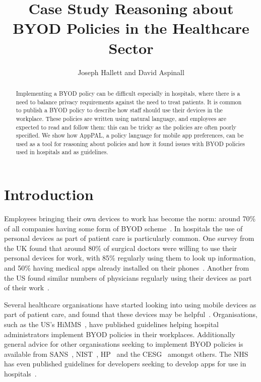 \documentclass[a4paper]{article}
\title{Case Study Reasoning about BYOD Policies in the Healthcare Sector}
\author{Joseph Hallett and David Aspinall}
\newcommand{\apppal}[0]{App{P}{A}{L}}
\begin{document}
\maketitle

\begin{abstract}
  Implementing a \ac{BYOD} policy can be difficult especially in hospitals, where there is a need to balance privacy requirements against the need to treat patients.
  It is common to publish a \ac{BYOD} policy to describe how staff should use their devices in the workplace.
  These policies are written using natural language, and employees are expected to read and follow them: this can be tricky as the policies are often poorly specified.
  We show how \apppal{}, a policy language for mobile app preferences, can be used as a tool for reasoning about policies and how it found issues with BYOD policies used in hospitals and as guidelines.
\end{abstract}

\section{Introduction}
\label{sec:intro}

Employees bringing their own devices to work has become the norm:
  around 70\% of all companies having some form of \ac{BYOD} scheme~\cite{schulze_byod_2016}.
In hospitals the use of personal devices as part of patient care is particularly common.
One survey from the UK found that around 80\% of surgical doctors were willing to use their personal devices for work, with 85\% regularly using them to look up information, and 50\% having medical apps already installed on their phones~\cite{patel_uk_2015}.  Another from the US found similar numbers of physicians regularly using their devices as part of their work~\cite{moyer_managing_2013}.

Several healthcare organisations have started looking into using mobile devices as part of patient care, and found that these devices may be helpful~\cite{prgomet_impact_2009,faulds_feasibility_2016}.  
Organisations, such as the US's \ac{HiMMS}~\cite{seymour_mobile_2012}, have published guidelines helping hospital administrators implement BYOD policies in their workplaces.  
Additionally general advice for other organisations seeking to implement BYOD policies is available from SANS~\cite{nicholas_r._c._guerin_security_2008}, NIST~\cite{souppaya_guidelines_????}, HP~\cite{hp_byod_????} and the CESG~\cite{cesg_byod_2015} amongst others.
The NHS has even published guidelines for developers seeking to develop apps for use in hospitals~\cite{prgomet_impact_2009}.
\end{document}
